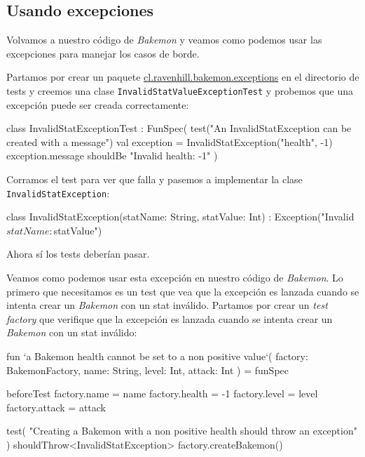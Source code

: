\subsection{Usando excepciones}
  Volvamos a nuestro código de \textit{Bakemon} y veamos como podemos usar las excepciones para
  manejar los casos de borde.

  Partamos por crear un paquete \url{cl.ravenhill.bakemon.exceptions} en el directorio de tests
  y creemos una clase \texttt{InvalidStatValueExceptionTest} y probemos que una excepción puede ser 
  creada correctamente:

  \begin{kotlin}
    class InvalidStatExceptionTest : FunSpec({
      test("An InvalidStatException can be created with a message") {
        val exception = InvalidStatException("health", -1)
        exception.message shouldBe "Invalid health: -1"
      }
    })
  \end{kotlin}

  Corramos el test para ver que falla y pasemos a implementar la clase 
  \texttt{InvalidStatException}:

  \begin{kotlin}
    class InvalidStatException(statName: String, statValue: Int) :
        Exception("Invalid $statName: $statValue")
  \end{kotlin}

  Ahora sí los tests deberían pasar.

  Veamos como podemos usar esta excepción en nuestro código de \textit{Bakemon}.
  Lo primero que necesitamos es un test que vea que la excepción es lanzada cuando se intenta
  crear un \textit{Bakemon} con un stat inválido.
  Partamos por crear un \textit{test factory} que verifique que la excepción es lanzada cuando
  se intenta crear un \textit{Bakemon} con un stat inválido:

  \begin{kotlin}
    fun `a Bakemon health cannot be set to a non positive value`(
      factory: BakemonFactory, name: String, level: Int, attack: Int
    ) = funSpec {

      beforeTest {
        factory.name = name
        factory.health = -1
        factory.level = level
        factory.attack = attack
      }

      test(
        "Creating a Bakemon with a non positive health should throw an exception"
      ) {
        shouldThrow<InvalidStatException> { factory.createBakemon() }
      }
    }
  \end{kotlin}

